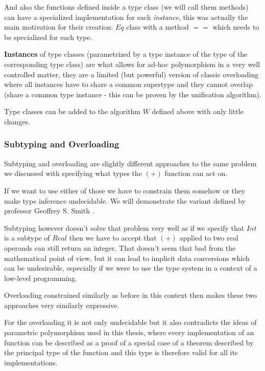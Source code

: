 And also the functions defined inside a type class (we will call them methods) can have a specialized implementation for each \emph{instance}, this was actually the main motivation for their creation: $Eq$ class with a method $==$ which needs to be specialized for each type. %

\textbf{Instances} of type classes (parametrized by a type instance of the type of the corresponding type class) are what allows for ad-hoc polymorphism %
in a very well controlled matter, they are a limited (but powerful) version of classic overloading where all instances have to share a common supertype and they cannot overlap (share a common type instance - this can be proven by the unification algorithm).

Type classes can be added to the algorithm $W$ defined above with only little changes. %

\subsubsection{Subtyping and Overloading}


Subtyping and overloading are slightly different approaches to the same problem we discussed with specifying what types the $(+)$ function can act on.

If we want to use either of those we have to constrain them somehow or they make type inference undecidable. We will demonstrate the variant defined by professor Geoffrey S. Smith \cite{smith1993polymorphic}.

Subtyping however doesn't solve that problem very well as if we specify that $Int$ is a subtype of $Real$ then we have to accept that $(+)$ applied to two real operands can still return an integer. That doesn't seem that bad from the mathematical point of view, but it can lead to implicit data conversions which can be undesirable, especially if we were to use the type system in a context of a low-level programming. %

Overloading constrained similarly as before in this context then makes these two approaches very similarly expressive. %

For the overloading it is not only undecidable but it also contradicts the ideas of parametric polymorphism used in this thesis, where every implementation of an function can be described as a proof of a special case of a theorem described by the principal type of the function and this type is therefore valid for all its implementations. %

